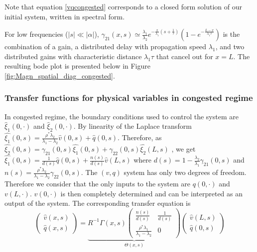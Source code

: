 \documentclass[preprint]{elsarticle}
\begin{document}
Note that equation \eqref{vqcongested} corresponds to a closed form solution of our initial system, written in spectral form.

For low frequencies ($\left|s\right|\ll\left|\alpha\right|$), 
$\gamma_{21}\left(x,s\right)
\simeq
\frac{\lambda_{1}}{\lambda_{2}}
e^{-\frac{x}{\lambda_{1}} \left( s + \frac{1}{\tau} \right)}
\left(
	1 -
	e^{-\frac{L-x}{\lambda_{1}\tau}}
\right)
$
is the combination of a gain, a distributed delay with propagation speed $\lambda_{1}$, and two distributed gains with characteristic distance $\lambda_{1}\tau$ that cancel out for $x = L$. The resulting bode plot is presented below in Figure \ref{fig:Magn_spatial_diag_congested}.

\subsubsection{Transfer functions for physical variables in congested regime}
In congested regime, the boundary conditions used to control the system are $\hat{\xi}_{1}\left(0,\cdot\right)$ and $\hat{\xi}_{2}\left(0,\cdot\right)$. By linearity of the Laplace transform 
$\hat{\xi_{1}}\left(0,s\right) = 
\frac{
	\rho^{*}\lambda_{2}
}{
	\lambda_{1} - \lambda_{2}
} 
\hat{v}\left(0,s\right)
+
\hat{q}\left(0,s\right)
$.
Therefore, as
$\hat{\xi_{2}}\left(0,s\right) =
\gamma_{21}\left(0,s\right)
\hat{\xi_{1}}\left(0,s\right)
+
\gamma_{22}\left(0,s\right)
\hat{\xi_{2}}\left(L,s\right)$
, we get
$\hat{\xi_{1}}\left(0,s\right) =
\frac{1}{d\left(s\right)}
\hat{q}\left(0,s\right)
+
\frac{n\left(s\right)}{d\left(s\right)}
\hat{v}\left(L,s\right)
$
where
$d\left(s\right) = 1 - \frac{\lambda_{2}}{\lambda_{1}}\gamma_{21}\left(0,s\right)$
and
$n\left(s\right) = \frac{\rho^{*} \lambda_{2}}{\lambda_{1} - \lambda_{2}} \gamma_{22}\left(0,s\right)$. The $\left(v,q\right)$ system has only two degrees of freedom. Therefore we consider that the only inputs to the system are $q\left(0,\cdot\right)$ and $v\left(L,\cdot\right)$. $v\left(0,\cdot\right)$ is then completely determined and can be interpreted as an output of the system. The corresponding transfer equation is
\begin{equation}
\begin{pmatrix}
	\hat{v}\left(x,s\right)
	\\
	\hat{q}\left(x,s\right)
\end{pmatrix}
=
\underset{\Theta\left(x,s\right)}{
\underbrace{
R^{-1}\Gamma\left(x,s\right)
\begin{pmatrix}
	\frac{n\left(s\right)}{d\left(s\right)}
		&
	\frac{1}{d\left(s\right)}	
	\\
	\frac{\rho^{*}\lambda_{1}}{\lambda_{1} - \lambda_{2}}
		&
	0
\end{pmatrix}
}
}
\begin{pmatrix}
	\hat{v}\left(L,s\right)
	\\
	\hat{q}\left(0,s\right)
\end{pmatrix}
\end{equation}
\end{document}

